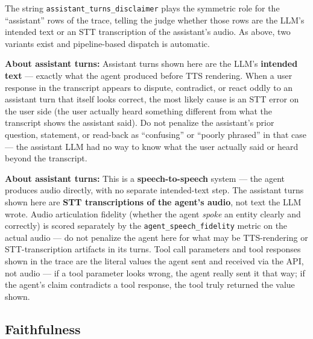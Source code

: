 The string \texttt{assistant\_turns\_disclaimer} plays the symmetric role for the ``assistant'' rows of the trace, telling the judge whether those rows are the LLM's intended text or an STT transcription of the assistant's audio. As above, two variants exist and pipeline-based dispatch is automatic.

\begin{tcolorbox}[promptbox, title={\small \texttt{assistant\_turns\_disclaimer} (cascade)}]
\textbf{About assistant turns:} Assistant turns shown here are the LLM's \textbf{intended text} --- exactly what the agent produced before TTS rendering. When a user response in the transcript appears to dispute, contradict, or react oddly to an assistant turn that itself looks correct, the most likely cause is an STT error on the user side (the user actually heard something different from what the transcript shows the assistant said). Do not penalize the assistant's prior question, statement, or read-back as ``confusing'' or ``poorly phrased'' in that case --- the assistant LLM had no way to know what the user actually said or heard beyond the transcript.
\end{tcolorbox}

\begin{tcolorbox}[promptbox, title={\small \texttt{assistant\_turns\_disclaimer} (S2S)}]
\textbf{About assistant turns:} This is a \textbf{speech-to-speech} system --- the agent produces audio directly, with no separate intended-text step. The assistant turns shown here are \textbf{STT transcriptions of the agent's audio}, not text the LLM wrote. Audio articulation fidelity (whether the agent \emph{spoke} an entity clearly and correctly) is scored separately by the \texttt{agent\_speech\_fidelity} metric on the actual audio --- do not penalize the agent here for what may be TTS-rendering or STT-transcription artifacts in its turns. Tool call parameters and tool responses shown in the trace are the literal values the agent sent and received via the API, not audio --- if a tool parameter looks wrong, the agent really sent it that way; if the agent's claim contradicts a tool response, the tool truly returned the value shown.
\end{tcolorbox}

\subsection{Faithfulness}
\label{app:prompt-faithfulness}

